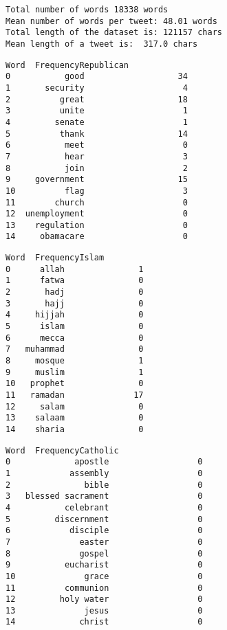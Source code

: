 \documentclass[11pt]{article}
\begin{document}
    \begin{Verbatim}[commandchars=\\\{\}]
Total number of words 18338 words
Mean number of words per tweet: 48.01 words
Total length of the dataset is: 121157 chars
Mean length of a tweet is:  317.0 chars
    \end{Verbatim}

            \begin{tcolorbox}[breakable, size=fbox, boxrule=.5pt, pad at break*=1mm, opacityfill=0]
\begin{Verbatim}[commandchars=\\\{\}]
            Word  FrequencyRepublican
0           good                   34
1       security                    4
2          great                   18
3          unite                    1
4         senate                    1
5          thank                   14
6           meet                    0
7           hear                    3
8           join                    2
9     government                   15
10          flag                    3
11        church                    0
12  unemployment                    0
13    regulation                    0
14     obamacare                    0
\end{Verbatim}
\end{tcolorbox}
        
            \begin{tcolorbox}[breakable, size=fbox, boxrule=.5pt, pad at break*=1mm, opacityfill=0]
\begin{Verbatim}[commandchars=\\\{\}]
        Word  FrequencyIslam
0      allah               1
1      fatwa               0
2       hadj               0
3       hajj               0
4     hijjah               0
5      islam               0
6      mecca               0
7   muhammad               0
8     mosque               1
9     muslim               1
10   prophet               0
11   ramadan              17
12     salam               0
13    salaam               0
14    sharia               0
\end{Verbatim}
\end{tcolorbox}
        
            \begin{tcolorbox}[breakable, size=fbox, boxrule=.5pt, pad at break*=1mm, opacityfill=0]
\begin{Verbatim}[commandchars=\\\{\}]
                 Word  FrequencyCatholic
0             apostle                  0
1            assembly                  0
2               bible                  0
3   blessed sacrament                  0
4           celebrant                  0
5         discernment                  0
6            disciple                  0
7              easter                  0
8              gospel                  0
9           eucharist                  0
10              grace                  0
11          communion                  0
12         holy water                  0
13              jesus                  0
14             christ                  0
\end{Verbatim}
\end{tcolorbox}
        
\end{document}

